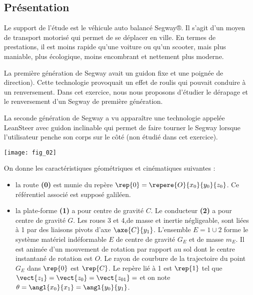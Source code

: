 \pagestyle{fancy}
\thispagestyle{plain}

\ifprof
\vspace{4.8cm}
\else
\vspace{4.8cm}
\fi

\def\columnseprulecolor{\color{ocre}}
\setlength{\columnseprule}{0.4pt} 



\setcounter{exo}{0}
\ifprof
\else
\begin{multicols}{2}
\fi

\section*{Présentation}
\ifprof
\else

Le support de l’étude est le véhicule auto balancé Segway®. Il s’agit d’un moyen de transport motorisé qui permet de se déplacer en ville. En termes de prestations, il est moins rapide qu’une voiture ou qu’un scooter, mais plus maniable, plus écologique, moins encombrant et nettement plus moderne.

	La première génération de Segway avait un guidon fixe et une poignée de direction). Cette technologie provoquait un effet de roulis qui pouvait conduire à un renversement. Dans cet exercice, nous nous proposons d’étudier le dérapage et le renversement d’un Segway de première génération.
	
	La seconde génération de Segway a vu apparaître une technologie appelée LeanSteer avec guidon inclinable qui permet de faire tourner le Segway lorsque l'utilisateur penche son corps sur le côté (non étudié dans cet exercice).

\begin{center}
\texttt{[image: fig\_02]}
\end{center}


On donne les caractéristiques géométriques et cinématiques suivantes :
\begin{itemize}
\item la route \textbf{(0)} est munie du repère $\rep{0}=\repere{O}{x_0}{y_0}{z_0}$. Ce référentiel associé est supposé galiléen.
\item la plate-forme \textbf{(1)} a pour centre de gravité $C$. Le conducteur \textbf{(2)} a pour centre de gravité $G$. Les roues 3 et 4,de masse et inertie négligeable, sont liées à 1 par des liaisons pivots d'axe $\axe{C}{y_1}$. L’ensemble 
$E=1\cup 2$ forme le système matériel indéformable $E$ de centre de gravité $G_E$ et de masse $m_E$. Il est animée d'un mouvement de rotation par rapport au sol dont le centre instantané de rotation est $O$. Le rayon de courbure de la trajectoire du point $G_E$ dans $\rep{0}$ est $\rep{C}$. Le repère lié à 1 est $\rep{1}$  tel que $\vect{z_1}=\vect{z_0}=\vect{z_{01}}=$ et on note $\theta=\angl{x_0}{x_1}=\angl{y_0}{y_1}$. 
\end{itemize}



\end{multicols}
